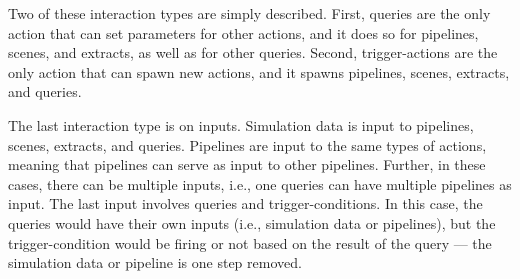 Two of these interaction types are simply described.  
%
First, queries are the only action that can set parameters for other actions, and it does so for
pipelines, scenes, and extracts, as well as for other queries.
%
Second, trigger-actions are the only action that can spawn new actions, and it spawns pipelines,
scenes, extracts, and queries.
%

The last interaction type is on inputs.
%
Simulation data is input to pipelines, scenes, extracts, and queries.
%
Pipelines are input to the same types of actions, meaning that pipelines can serve as input
to other pipelines.
%
Further, in these cases, there can be multiple inputs, i.e., one queries can have multiple
pipelines as input.
%
The last input involves queries and trigger-conditions. 
%
In this case, the queries would have their own inputs (i.e., simulation data or pipelines), 
but the trigger-condition would be firing or not based on the result of the query ---
the simulation data or pipeline is one step removed.

